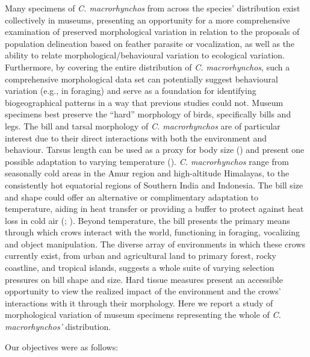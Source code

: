 \documentclass[10pt,a4paper]{article}
\begin{document}
Many specimens of \emph{C. macrorhynchos} from across the species' distribution exist collectively in museums, presenting an opportunity for a more comprehensive examination of preserved morphological variation in relation to the proposals of population delineation based on feather parasite or vocalization, as well as the ability to relate morphological/behavioural variation to ecological variation.
Furthermore, by covering the entire distribution of \emph{C. macrorhynchos}, such a comprehensive morphological data set can potentially suggest behavioural variation (e.g., in foraging) and serve as a foundation for identifying biogeographical patterns in a way that previous studies could not.
Museum specimens best preserve the ``hard'' morphology of birds, specifically bills and legs.
The bill and tarsal morphology of \emph{C. macrorhynchos} are of particular interest due to their direct interactions with both the environment and behaviour.
Tarsus length can be used as a proxy for body size () and present one possible adaptation to varying temperature ().
\emph{C. macrorhynchos} range from seasonally cold areas in the Amur region and high-altitude Himalayas, to the consistently hot equatorial regions of Southern India and Indonesia.
The bill size and shape could offer an alternative or complimentary adaptation to temperature, aiding in heat transfer or providing a buffer to protect against heat loss in cold air (; ).
Beyond temperature, the bill presents the primary means through which crows interact with the world, functioning in foraging, vocalizing and object manipulation.
The diverse array of environments in which these crows currently exist, from urban and agricultural land to primary forest, rocky coastline, and tropical islands, suggests a whole suite of varying selection pressures on bill shape and size.
Hard tissue measures present an accessible opportunity to view the realized impact of the environment and the crows' interactions with it through their morphology.
Here we report a study of morphological variation of museum specimens representing the whole of \emph{C. macrorhynchos'} distribution.

Our objectives were as follows:
\end{document}
